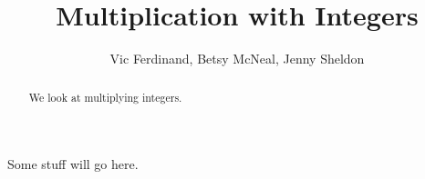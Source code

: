 \documentclass{ximera}
\title{Multiplication with Integers}
\author{Vic Ferdinand, Betsy McNeal, Jenny Sheldon}
\begin{document}
\begin{abstract}
We look at multiplying integers.
\end{abstract}
\maketitle

Some stuff will go here.
\end{document}
